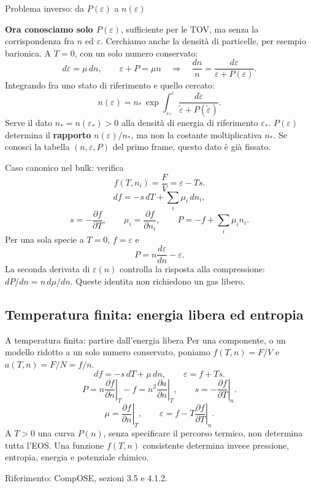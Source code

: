 \begin{frame}[t]{Problema inverso: da $P(\varepsilon)$ a $n(\varepsilon)$}
\vspace*{3mm}
\small\raggedright
\textbf{Ora conosciamo solo $P(\varepsilon)$}, sufficiente per le TOV,
ma senza la corrispondenza fra $n$ ed $\varepsilon$.
Cerchiamo anche la densit\`a di particelle, per esempio barionica.
\medskip
A $T=0$, con un solo numero conservato:
\[
d\varepsilon=\mu\,dn,\qquad
\varepsilon+P=\mu n
\quad\Longrightarrow\quad
\frac{dn}{n}=
\frac{d\varepsilon}{\varepsilon+P(\varepsilon)}.
\]
Integrando fra uno stato di riferimento e quello cercato:
\[
\boxed{
n(\varepsilon)=n_*\,\exp{
\displaystyle
\int_{\varepsilon_*}^{\varepsilon}
\frac{d\tilde\varepsilon}
{\tilde\varepsilon+P(\tilde\varepsilon)}
}.
}
\]
Serve il dato $n_*=n(\varepsilon_*)>0$ alla densit\`a di energia
di riferimento $\varepsilon_*$.
\smallskip
$P(\varepsilon)$ determina il \textbf{rapporto} $n(\varepsilon)/n_*$,
ma non la costante moltiplicativa $n_*$.
\smallskip
Se conosci la tabella $(n,\varepsilon,P)$ del primo frame,
questo dato \`e gi\`a fissato.
\end{frame}

\begin{frame}[t]{Caso canonico nel bulk: verifica}
\vspace*{3mm}
\small
\[
f(T,n_i)=\frac FV=\varepsilon-Ts.
\]
\[
df=-s\,dT+\sum_i\mu_i\,dn_i,
\]
\[
s=-\frac{\partial f}{\partial T},\qquad
\mu_i=\frac{\partial f}{\partial n_i},\qquad
P=-f+\sum_i\mu_i n_i.
\]
Per una sola specie a $T=0$, $f=\varepsilon$ e
\[
P=n\frac{d\varepsilon}{dn}-\varepsilon.
\]
La seconda derivata di $\varepsilon(n)$ controlla la risposta alla compressione:
$dP/dn=n\,d\mu/dn$. Queste identita non richiedono un gas libero.
\end{frame}

\subsection{Temperatura finita: energia libera ed entropia}

\begin{frame}[t]{A temperatura finita: partire dall'energia libera}
\vspace*{3mm}
\small
Per una componente, o un modello ridotto a un solo numero conservato,
poniamo $f(T,n)=F/V$ e $a(T,n)=F/N=f/n$.
\[
df=-s\,dT+\mu\,dn,\qquad
\varepsilon=f+Ts.
\]
\[
\boxed{P=n\left.\frac{\partial f}{\partial n}\right|_T-f
=n^2\left.\frac{\partial a}{\partial n}\right|_T,\qquad
s=-\left.\frac{\partial f}{\partial T}\right|_n.}
\]
\[
\boxed{\mu=\left.\frac{\partial f}{\partial n}\right|_T,
\qquad \varepsilon=f-T\left.\frac{\partial f}{\partial T}\right|_n.}
\]
A $T>0$ una curva $P(n)$, senza specificare il percorso termico,
non determina tutta l'EOS. Una funzione $f(T,n)$ consistente determina
invece pressione, entropia, energia e potenziale chimico.
\par\smallskip
{\footnotesize Riferimento: CompOSE, sezioni 3.5 e 4.1.2.}
\end{frame}

